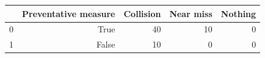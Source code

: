 \begin{tabular}{lrrrr}
\toprule
 & Preventative measure & Collision & Near miss & Nothing \\
\midrule
0 & True & 40 & 10 & 0 \\
1 & False & 10 & 0 & 0 \\
\bottomrule
\end{tabular}

